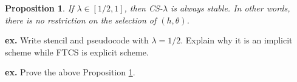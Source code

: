 \documentclass{article}
\newtheorem{proposition}[theorem]{Proposition}
\begin{document}
\begin{proposition}\label{p:satiblity01}
 If $\lambda \in [1/2, 1]$, then CS-$\lambda$ is always stable. In other words, there is no restriction on the selection of $(h, \theta)$.
\end{proposition}




{\bf ex.} Write stencil and pseudocode with $\lambda = 1/2$. Explain why it is an implicit scheme while FTCS is explicit scheme.



{\bf ex.} Prove the above Proposition \ref{p:satiblity01}.
\end{document}
